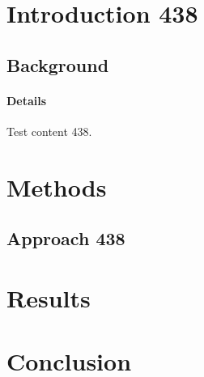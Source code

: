 \documentclass{article}
\begin{document}
\section{Introduction 438}
\subsection{Background}
\paragraph{Details} Test content 438.
\section{Methods}
\subsection{Approach 438}
\section{Results}
\section{Conclusion}
\end{document}
